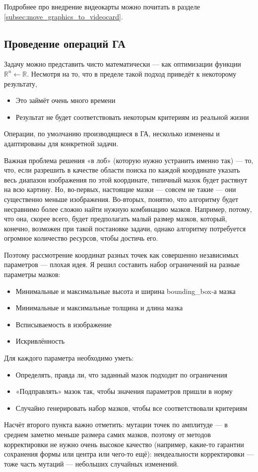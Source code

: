 Подробнее про внедрение видеокарты можно почитать в разделе \ref{subsec:move_graphics_to_videocard}.

\subsection{Проведение операций ГА}\label{subsec:ga-operations}

Задачу можно представить чисто математически — как оптимизации функции $\mathbb{R}^n \longleftarrow \mathbb{R}$.
Несмотря на то, что в пределе такой подход приведёт к некоторому результату,
\begin{itemize}
    \item Это займёт очень много времени
    \item Результат не будет соответствовать некоторым критериям из реальной жизни
\end{itemize}

Операции, по умолчанию производящиеся в ГА, несколько изменены и адаптированы для конкретной задачи.



Важная проблема решения «в лоб» (которую нужно устранить именно так) — то, что, если разрешить в качестве области поиска
по каждой координате указать весь диапазон изображения по этой координате, типичный мазок будет растянут на всю картину.
Но, во-первых, настоящие мазки — совсем не такие — они существенно меньше изображения.
Во-вторых, понятно, что алгоритму будет несравнимо более сложно найти нужную комбинацию мазков.
Например, потому, что она, скорее всего, будет предполагать малый размер мазков, который, конечно,
возможен при такой постановке задачи, однако алгоритму потребуется огромное количество ресурсов, чтобы достичь его.

Поэтому рассмотрение координат разных точек как совершенно независимых параметров — плохая идея.
Я решил составить набор ограничений на разные параметры мазков:
\begin{itemize}
    \item Минимальные и максимальные высота и ширина bounding\_box-а мазка
    \item Минимальные и максимальные толщина и длина мазка
    \item Всписываемость в изображение
    \item Искривлённость
\end{itemize}

Для каждого параметра необходимо уметь:
\begin{itemize}
    \item Определять, правда ли, что заданный мазок подходит по ограничения
    \item «Подправлять» мазок так, чтобы значения параметров пришли в норму
    \item Случайно генерировать набор мазков, чтобы все соответствовали критериям
\end{itemize}
Насчёт второго пункта важно отметить: мутации точек по амплитуде — в среднем заметно меньше размера самих мазков,
поэтому от методов корректировки не нужно очень высокое качество (например, какие-то гарантии сохранения формы или центра или чего-то ещё):
неидеальности корректировки — тоже часть мутаций — небольших случайных изменений.

